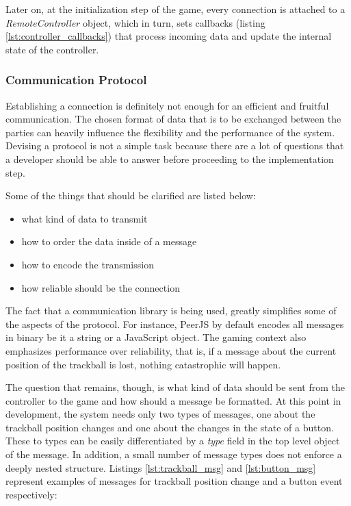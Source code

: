 Later on, at the initialization step of the game, every connection is attached
to a \emph{RemoteController} object, which in turn, sets callbacks (listing
\ref{lst:controller_callbacks}) that process incoming data and update the
internal state of the controller.




\subsubsection{Communication Protocol}

Establishing a connection is definitely not enough for an efficient and fruitful
communication. The chosen format of data that is to be exchanged between the
parties can heavily influence the flexibility and the performance of the system.
Devising a protocol is not a simple task because there are a lot of questions
that a developer should be able to answer before proceeding to the
implementation step.

Some of the things that should be clarified are listed below:

\begin{itemize}
\item what kind of data to transmit
\item how to order the data inside of a message
\item how to encode the transmission
\item how reliable should be the connection
\end{itemize}

The fact that a communication library is being used, greatly simplifies some of
the aspects of the protocol. For instance, PeerJS by default encodes all
messages in binary be it a string or a JavaScript object. The gaming context
also emphasizes performance over reliability, that is, if a message about the
current position of the trackball is lost, nothing catastrophic will happen.

The question that remains, though, is what kind of data should be sent from the
controller to the game and how should a message be formatted. At this point in
development, the system needs only two types of messages, one about the
trackball position changes and one about the changes in the state of a button.
These to types can be easily differentiated by a \emph{type} field in the top
level object of the message. In addition, a small number of message types does
not enforce a deeply nested structure. Listings \ref{lst:trackball_msg} and
\ref{lst:button_msg} represent examples of messages for trackball position
change and a button event respectively:

